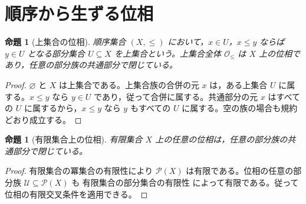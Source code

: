 \documentclass[a5paper,10pt,dvipdfmx]{jsarticle}
\theoremstyle{definition}
\theoremstyle{plain}
\newtheorem{prop}[ruledef]{命題}
\newcommand{\Pow}{\mathcal{P}}
\newcommand{\GenronRefText}[2]{#2}
\begin{document}
\section{順序から生ずる位相}
\begin{prop}[上集合の位相]\label{k157}
順序集合 $(X,\leq)$ において，$x\in U$，$x\leq y$ ならば $y\in U$ となる部分集合 $U\subseteq X$ を上集合という。上集合全体 $\mathcal{O}_{\leq}$ は $X$ 上の位相であり，任意の部分族の共通部分で閉じている。
\end{prop}
\begin{proof}
$\varnothing$ と $X$ は上集合である。上集合族の合併の元 $x$ は，ある上集合 $U$ に属する。$x\leq y$ なら $y\in U$ であり，従って合併に属する。共通部分の元 $x$ はすべての $U$ に属するから，$x\leq y$ なら $y$ もすべての $U$ に属する。空の族の場合も規約どおり成立する。
\end{proof}
\begin{prop}[有限集合上の位相]\label{k158}
有限集合 $X$ 上の任意の位相は，任意の部分族の共通部分で閉じている。
\end{prop}
\begin{proof}
\GenronRefText{K-000117}{有限集合の冪集合の有限性}により $\Pow(X)$ は有限である。位相の任意の部分族 $\mathcal U\subseteq\Pow(X)$ も \GenronRefText{K-000113}{有限集合の部分集合の有限性} によって有限である。従って位相の有限交叉条件を適用できる。
\end{proof}
\par\medskip{}
\end{document}
